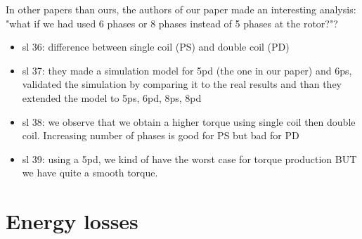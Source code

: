 In other papers than ours, the authors of our paper made an interesting analysis: "what if we had used 6 phases or 8 phases instead of 5 phases at the rotor?"? 
\begin{itemize}
    \item sl 36: difference between single coil (PS) and double coil (PD) 
    \item sl 37: they made a simulation model for 5pd (the one in our paper) and 6ps, validated the simulation by comparing it to the real results and than they extended the model to 5ps, 6pd, 8ps, 8pd
    \item sl 38: we observe that we obtain a higher torque using single coil then double coil. Increasing number of phases is good for PS but bad for PD
    \item sl 39: using a 5pd, we kind of have the worst case for torque production BUT we have quite a smooth torque. 
\end{itemize}


\section{Energy losses}
